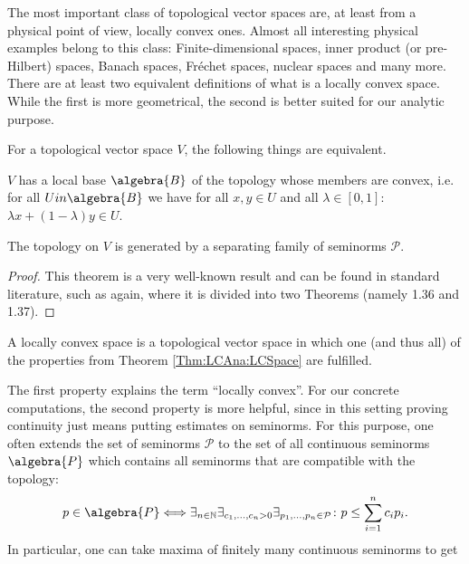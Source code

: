 The most important class of topological vector spaces are, at least from a 
physical point of view, locally convex ones. Almost all 
interesting physical examples belong to this class: Finite-dimensional spaces, 
inner product (or pre-Hilbert) spaces, Banach spaces, Fr\'echet spaces, 
nuclear spaces and many more. There are at least two equivalent 
definitions of what is a locally convex space. While the first is more 
geometrical, the second is better suited for our analytic purpose.
\begin{theorem}
	\label{Thm:LCAna:LCSpace}
	For a topological vector space $V$, the following things are equivalent.
	\begin{theoremlist}
		\item
		$V$ has a local base $\algebra{B}$ of the topology whose members are 
		convex, i.e. for all $U in \algebra{B}$ we have for all $x,y \in U$
		and all $\lambda \in [0,1]$: $\lambda x + (1 - \lambda)y \in U$.
		\item
		The topology on $V$ is generated by a separating family of seminorms 
		$\mathcal{P}$.
	\end{theoremlist}
\end{theorem}
\begin{proof}
	This theorem is a very well-known result and can be found in standard 
	literature, such as \cite{rudin:1991a} again, where it is divided into 
	two 	Theorems (namely 1.36 and 1.37).
\end{proof}
\begin{definition}
	\label{Def:LCSpace}
	A locally convex space is a topological vector space in which one (and 
	thus all) of the properties from Theorem \ref{Thm:LCAna:LCSpace} are 
	fulfilled.
\end{definition}
The first property explains the term ``locally convex''. 
For our concrete computations, the second property is more helpful, 
since in this setting proving continuity just means putting estimates on 
seminorms. For this purpose, one often extends the set of seminorms 
$\mathcal{P}$ to the set of all continuous seminorms $\algebra{P}$ which 
contains all seminorms that are compatible with the topology:
\begin{equation*}
	p \in \algebra{P}
	\Longleftrightarrow
	\exists_{n \in \mathbb{N}}
	\exists_{c_1, \ldots, c_n > 0}
	\exists_{p_1, \ldots, p_n \in \mathcal{P}}
	\colon
	p 
	\leq 
	\sum\limits_{i = 1}^n
	c_i p_i.
\end{equation*}
In particular, one can take maxima of finitely many continuous seminorms to get 
